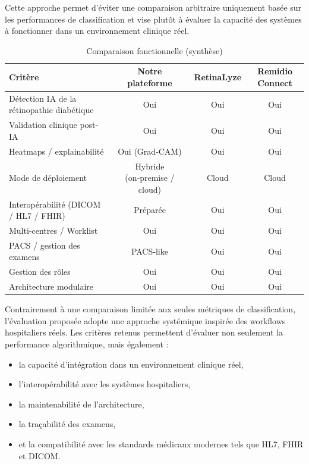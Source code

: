\documentclass[12pt,a4paper,oneside]{report}
\begin{document}
Cette approche permet d'éviter une comparaison arbitraire uniquement basée
sur les performances de classification et vise plutôt à évaluer la capacité des
systèmes à fonctionner dans un environnement clinique réel.

\begin{table}[H]
\centering
\caption{Comparaison fonctionnelle (synthèse)}
\begin{tabular}{|p{5cm}|c|c|c|}
\hline
\textbf{Critère} & \textbf{Notre plateforme} & \textbf{RetinaLyze} & \textbf{Remidio Connect} \\
\hline
Détection IA de la rétinopathie diabétique & Oui & Oui & Oui \\
\hline
Validation clinique post-IA & Oui & Oui & Oui \\
\hline
Heatmaps / explainabilité & Oui (Grad‑CAM) & Oui & Oui \\
\hline
Mode de déploiement & Hybride (on‑premise / cloud) & Cloud & Cloud \\
\hline
Interopérabilité (DICOM / HL7 / FHIR) & Préparée & Oui & Oui \\
\hline
Multi‑centres / Worklist & Oui & Oui & Oui \\
\hline
PACS / gestion des examens & PACS‑like & Oui & Oui \\
\hline
Gestion des rôles & Oui & Oui & Oui \\
\hline
Architecture modulaire & Oui & Oui & Oui \\
\hline
\end{tabular}
\label{tab:comparison_platforms}
\end{table}

Contrairement à une comparaison limitée aux seules métriques de
classification, l'évaluation proposée adopte une approche systémique inspirée
des workflows hospitaliers réels. Les critères retenus permettent d'évaluer non
seulement la performance algorithmique, mais également :
\begin{itemize}
    \item la capacité d'intégration dans un environnement clinique réel,
    \item l'interopérabilité avec les systèmes hospitaliers,
    \item la maintenabilité de l'architecture,
    \item la traçabilité des examens,
    \item et la compatibilité avec les standards médicaux modernes tels que HL7, FHIR et DICOM.
\end{itemize}
\end{document}
